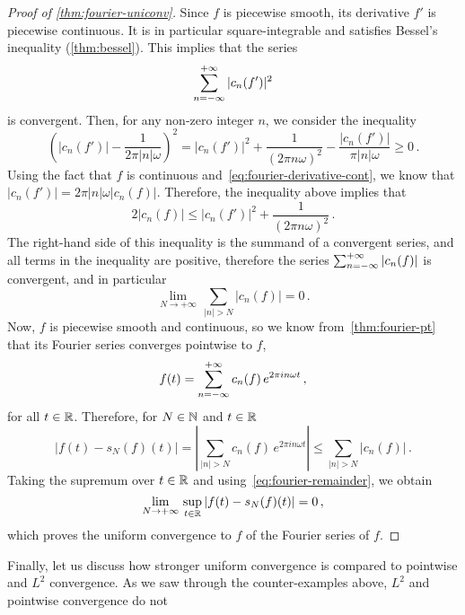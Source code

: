 \begin{proof}[Proof of \cref{thm:fourier-uniconv}]
  Since $f$ is piecewise smooth, its derivative $f'$ is piecewise continuous. It is in
  particular square-integrable and satisfies Bessel's inequality (\cref{thm:bessel}). This
  implies that the series
  \begin{equation}
    \sum_{n=-\infty}^{+\infty}|c_n(f')|^2
  \end{equation}
  is convergent. Then, for any non-zero integer $n$, we consider the inequality
  \begin{equation}
    \left(|c_n(f')|-\frac{1}{2\pi |n|\omega}\right)^2=|c_n(f')|^2
    +\frac{1}{(2\pi n\omega)^2}-\frac{|c_n(f')|}{\pi |n|\omega}\geq 0\,.
  \end{equation}
  Using the fact that $f$ is continuous and~\cref{eq:fourier-derivative-cont}, we know
  that $|c_n(f')|=2\pi|n|\omega |c_n(f)|$. Therefore, the inequality above implies that
  \begin{equation}
    2|c_n(f)|\leq |c_n(f')|^2
    +\frac{1}{(2\pi n\omega)^2}\,.
    \label{eq:fourier-remainder}
  \end{equation}
  The right-hand side of this inequality is the summand of a convergent series, and all
  terms in the inequality are positive, therefore the series $\sum_{n=-\infty}^{+\infty}|c_n(f)|$ is
  convergent, and in particular
  \begin{equation}
    \lim_{N\to+\infty}\,\sum_{|n|>N}|c_n(f)|=0\,.
  \end{equation}
  Now, $f$ is piecewise smooth and continuous, so we know from~\cref{thm:fourier-pt} that
  its Fourier series converges pointwise to $f$, \ie
  \begin{equation}
    f(t)=\sum_{n=-\infty}^{+\infty}c_n(f)\,e^{2\pi i n\omega t}\,,
  \end{equation}
  for all $t\in\mathbb{R}$. Therefore, for $N\in\mathbb{N}$ and $t\in\mathbb{R}$
  \begin{equation}
    |f(t)-s_N(f)(t)|=\left|\sum_{|n|>N}c_n(f)\,e^{2\pi i n\omega t}\right|
    \leq \sum_{|n|>N}|c_n(f)|\,.
  \end{equation}
  Taking the supremum over $t\in\mathbb{R}$ and using~\cref{eq:fourier-remainder}, we
  obtain
  \begin{equation}
    \lim_{N\to+\infty}\,\sup_{t\in\mathbb{R}}|f(t)-s_N(f)(t)|=0\,,
  \end{equation}
  which proves the uniform convergence to $f$ of the Fourier series of $f$.
\end{proof}
Finally, let us discuss how stronger uniform convergence is compared to pointwise and
$L^2$ convergence. As we saw through the counter-examples above, $L^2$ and pointwise convergence do not
